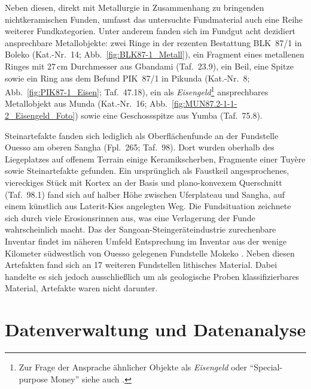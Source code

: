\begin{multicols}{2}
Neben diesen, direkt mit Metallurgie in Zusammenhang zu bringenden nichtkeramischen Funden, umfasst das untersuchte Fundmaterial auch eine Reihe weiterer Fundkategorien. Unter anderem fanden sich im Fundgut acht dezidiert ansprechbare Metallobjekte: zwei Ringe in der rezenten Bestattung BLK~87/1 in Boleko (Kat.-Nr.~14; Abb.~\ref{fig:BLK87-1_Metall}), ein Fragment eines metallenen Ringes mit 27\,cm Durchmesser aus Gbandami (Taf.~23.9), ein Beil, eine Spitze sowie ein Ring aus dem Befund PIK~87/1 in Pikunda (Kat.-Nr.~8; Abb.~\ref{fig:PIK87-1_Eisen}; Taf.~47.18), ein als \textit{Eisengeld}\footnote{Zur Frage der Ansprache ähnlicher Objekte als \textit{Eisengeld} oder \enquote{Special-purpose Money} siehe auch \textcite[119 Abb.~6.17, 122, 138]{Eggert.2016}.} ansprechbares Metallobjekt aus Munda (Kat.-Nr.~16; Abb.~\ref{fig:MUN87.2-1-1-2_Eisengeld_Foto}) sowie eine Geschossspitze aus Yumba (Taf.~75.8).


Steinartefakte fanden sich lediglich als Oberflächenfunde an der Fundstelle Ouesso am oberen \mbox{Sangha} (Fpl.~265; Taf.~98). Dort wurden oberhalb des Liegeplatzes auf offenem Terrain einige Keramikscherben, Fragmente einer Tuyère sowie Steinartefakte gefunden. Ein ursprünglich als Faustkeil angesprochenes, viereckiges Stück mit Kortex an der Basis und plano-konvexem Querschnitt (Taf.~98.1) fand sich auf halber Höhe zwischen Uferplateau und \mbox{Sangha}, auf einem künstlich aus Laterit-Kies angelegten Weg. Die Fundsituation zeichnete sich durch viele Erosionsrinnen aus, was eine Verlagerung der Funde wahrscheinlich macht. Das der Sangoan-Steingeräteindustrie zurechenbare Inventar findet im näheren Umfeld Entsprechung im Inventar aus der wenige Kilometer südwestlich von Ouesso gelegenen Fundstelle Mokeko \parencites{Lanfranchi.1991c}{Lanfranchi.1996b}. Neben diesen Artefakten fand sich an 17 weiteren Fundstellen lithisches Material. Dabei handelte es sich jedoch ausschließlich um als geologische Proben klassifizierbares Material, Artefakte waren nicht darunter.


\section{Datenverwaltung und Datenanalyse}\label{sec:Datenhaltung}


\end{multicols}
